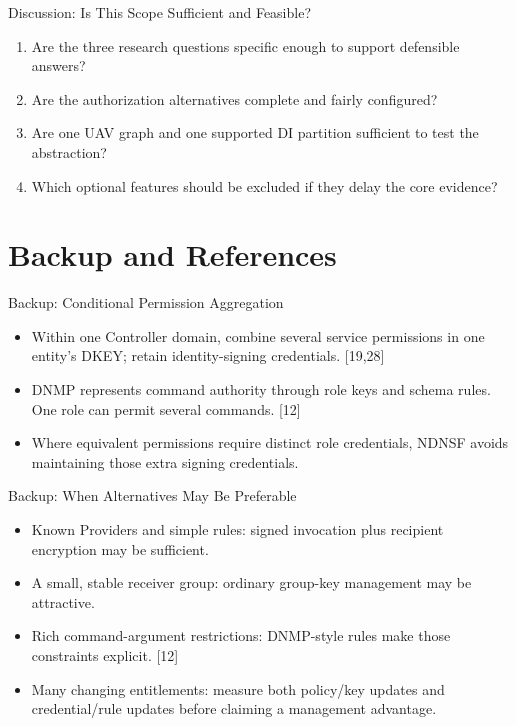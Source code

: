 \begin{frame}{Discussion: Is This Scope Sufficient and Feasible?}
\begin{enumerate}
\item Are the three research questions specific enough to support defensible answers?
\item Are the authorization alternatives complete and fairly configured?
\item Are one UAV graph and one supported DI partition sufficient to test the abstraction?
\item Which optional features should be excluded if they delay the core evidence?
\end{enumerate}
\vspace{4mm}
\end{frame}

\appendix
\section{Backup and References}
\begin{frame}{Backup: Conditional Permission Aggregation}
\begin{itemize}
\item Within one Controller domain, combine several service permissions in one entity's DKEY; retain identity-signing credentials. [19,28]
\item DNMP represents command authority through role keys and schema rules. One role can permit several commands. [12]
\item Where equivalent permissions require distinct role credentials, NDNSF avoids maintaining those extra signing credentials.
\end{itemize}
\vspace{3mm}
\end{frame}

\begin{frame}{Backup: When Alternatives May Be Preferable}
\begin{itemize}
\item Known Providers and simple rules: signed invocation plus recipient encryption may be sufficient.
\item A small, stable receiver group: ordinary group-key management may be attractive.
\item Rich command-argument restrictions: DNMP-style rules make those constraints explicit. [12]
\item Many changing entitlements: measure both policy/key updates and credential/rule updates before claiming a management advantage.
\end{itemize}
\vspace{3mm}
\end{frame}

